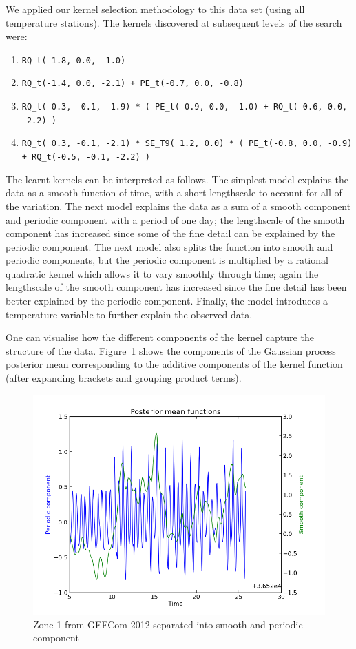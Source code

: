 \documentclass[twoside]{article}
\theoremstyle{definition}
\theoremstyle{remark}
\numberwithin{equation}{section}
\numberwithin{thm}{section}
\begin{document}
We applied our kernel selection methodology to this data set (using all temperature stations).
The kernels discovered at subsequent levels of the search were:
\begin{enumerate}
\item \texttt{RQ\_t(-1.8,  0.0, -1.0)}
\item \texttt{RQ\_t(-1.4,  0.0, -2.1) + PE\_t(-0.7,  0.0, -0.8)}
\item \texttt{RQ\_t( 0.3, -0.1, -1.9) * ( PE\_t(-0.9,  0.0, -1.0) + RQ\_t(-0.6,  0.0, -2.2) )}
\item \texttt{RQ\_t( 0.3, -0.1, -2.1) * SE\_T9( 1.2,  0.0) * ( PE\_t(-0.8,  0.0, -0.9) + RQ\_t(-0.5, -0.1, -2.2) )}
\end{enumerate}
The learnt kernels can be interpreted as follows.
The simplest model explains the data as a smooth function of time, with a short lengthscale to account for all of the variation.
The next model explains the data as a sum of a smooth component and periodic component with a period of one day; the lengthscale of the smooth component has increased since some of the fine detail can be explained by the periodic component.
The next model also splits the function into smooth and periodic components, but the periodic component is multiplied by a rational quadratic kernel which allows it to vary smoothly through time; again the lengthscale of the smooth component has increased since the fine detail has been better explained by the periodic component.
Finally, the model introduces a temperature variable to further explain the observed data.

One can visualise how the different components of the kernel capture the structure of the data.
Figure~\ref{fig:gef_z01_two_means} shows the components of the Gaussian process posterior mean corresponding to the additive components of the kernel function (after expanding brackets and grouping product terms).

\begin{figure}
\includegraphics[width=\columnwidth]{../figures/gef_load_z01_500_posteriors}
\caption{Zone 1 from GEFCom 2012 separated into smooth and periodic component}
\label{fig:gef_z01_two_means}
\end{figure}
\end{document}
